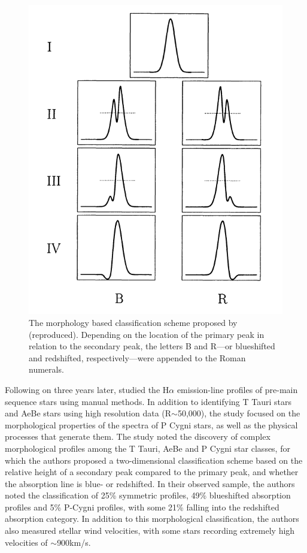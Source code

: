 \begin{figure}[!htb]
\centering
\includegraphics[scale=1]{figures/reipurth classes.png}
\caption{The morphology based classification scheme proposed by \citet{reipurth1996halpha} (reproduced). Depending on the location of the primary peak in relation to the secondary peak, the letters B and R—or blueshifted and redshifted, respectively—were appended to the Roman numerals.}
\end{figure}

Following on three years later, \citet{reipurth1996halpha} studied the H$\alpha$ emission-line profiles of pre-main sequence stars using manual methods. In addition to identifying T Tauri stars and AeBe stars using high resolution data (R$\sim$50,000), the study focused on the morphological properties of the spectra of P Cygni stars, as well as the physical processes that generate them. The study noted the discovery of complex morphological profiles among the T Tauri, AeBe and P Cygni star classes, for which the authors proposed a two-dimensional classification scheme based on the relative height of a secondary peak compared to the primary peak, and whether the absorption line is blue- or redshifted. In their observed sample, the authors noted the classification of 25\% symmetric profiles, 49\% blueshifted absorption profiles and 5\% P-Cygni profiles, with some 21\% falling into the redshifted absorption category. In addition to this morphological classification, the authors also measured stellar wind velocities, with some stars recording extremely high velocities of $\sim$900km/s. 


